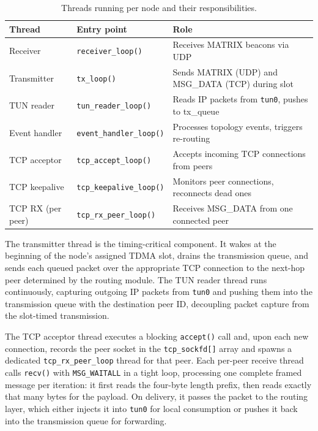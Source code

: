 \begin{table}[H]
\centering
\caption{Threads running per node and their responsibilities.}
\label{tab:threads}
\begin{tabular}{lll}
\toprule
\textbf{Thread} & \textbf{Entry point} & \textbf{Role} \\
\midrule
Receiver          & \texttt{receiver\_loop()}        & Receives MATRIX beacons via UDP \\
Transmitter       & \texttt{tx\_loop()}               & Sends MATRIX (UDP) and MSG\_DATA (TCP) during slot \\
TUN reader        & \texttt{tun\_reader\_loop()}      & Reads IP packets from \texttt{tun0}, pushes to tx\_queue \\
Event handler     & \texttt{event\_handler\_loop()}   & Processes topology events, triggers re-routing \\
TCP acceptor      & \texttt{tcp\_accept\_loop()}      & Accepts incoming TCP connections from peers \\
TCP keepalive     & \texttt{tcp\_keepalive\_loop()}   & Monitors peer connections, reconnects dead ones \\
TCP RX (per peer) & \texttt{tcp\_rx\_peer\_loop()}    & Receives MSG\_DATA from one connected peer \\
\bottomrule
\end{tabular}
\end{table}

The transmitter thread is the timing-critical component. It wakes at the beginning of the
node's assigned TDMA slot, drains the transmission queue, and sends each queued packet
over the appropriate TCP connection to the next-hop peer determined by the routing module.
The TUN reader thread runs continuously, capturing outgoing IP packets from \texttt{tun0} and
pushing them into the transmission queue with the destination peer ID, decoupling packet
capture from the slot-timed transmission.

The TCP acceptor thread executes a blocking \texttt{accept()} call and, upon each new
connection, records the peer socket in the \texttt{tcp\_sockfd[]} array and spawns a dedicated
\texttt{tcp\_rx\_peer\_loop} thread for that peer. Each per-peer receive thread calls
\texttt{recv()} with \texttt{MSG\_WAITALL} in a tight loop, processing one complete framed
message per iteration: it first reads the four-byte length prefix, then reads exactly that many
bytes for the payload. On delivery, it passes the packet to the routing layer, which either
injects it into \texttt{tun0} for local consumption or pushes it back into the transmission
queue for forwarding.

